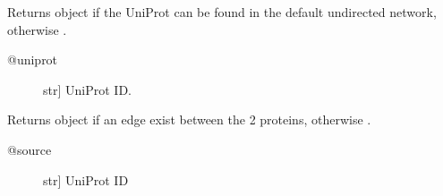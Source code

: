 \documentclass[letterpaper,10pt,english]{sphinxmanual}
\begin{document}
\begin{fulllineitems}

\begin{fulllineitems}
\label{\detokenize{reference:pypath.main.PyPath.uniq_ptms}}
\end{fulllineitems}


\begin{fulllineitems}
\label{\detokenize{reference:pypath.main.PyPath.up}}
Returns  object if the UniProt
can be found in the default undirected network,
otherwise .
\begin{description}
\item[{@uniprot}] \leavevmode{[}str{]}
UniProt ID.

\end{description}

\end{fulllineitems}


\begin{fulllineitems}
\label{\detokenize{reference:pypath.main.PyPath.up_affected_by}}
\end{fulllineitems}


\begin{fulllineitems}
\label{\detokenize{reference:pypath.main.PyPath.up_affects}}
\end{fulllineitems}


\begin{fulllineitems}
\label{\detokenize{reference:pypath.main.PyPath.up_edge}}
Returns  object if an edge exist between
the 2 proteins, otherwise .
\begin{description}
\item[{@source}] \leavevmode{[}str{]}
UniProt ID


\end{description}
\end{fulllineitems}
\end{fulllineitems}
\end{document}
